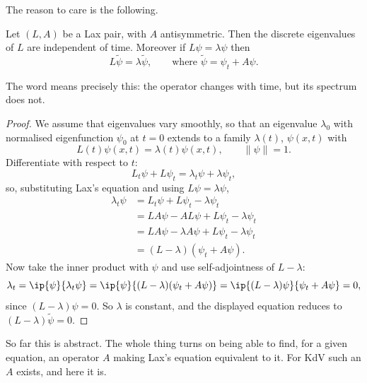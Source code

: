 The reason to care is the following.

\begin{theorem}
	Let $(L,A)$ be a Lax pair, with $A$ antisymmetric. Then the discrete eigenvalues of $L$ are independent of time. Moreover if $L\psi = \lambda\psi$ then
	$$
	L\tilde\psi = \lambda\tilde\psi, \qquad \text{where }\tilde\psi = \psi_t + A\psi.
	$$
\end{theorem}

The word  means precisely this: the operator changes with time, but its spectrum does not.

\begin{proof}
	We assume that eigenvalues vary smoothly, so that an eigenvalue $\lambda_0$ with normalised eigenfunction $\psi_0$ at $t=0$ extends to a family $\lambda(t)$, $\psi(x,t)$ with
	$$
	L(t)\psi(x,t) = \lambda(t)\psi(x,t), \qquad \|\psi\| = 1.
	$$
	Differentiate with respect to $t$:
	$$
	L_t\psi + L\psi_t = \lambda_t\psi + \lambda\psi_t,
	$$
	so, substituting Lax's equation and using $L\psi = \lambda\psi$,
	\begin{align*}
		\lambda_t\psi &= L_t\psi + L\psi_t - \lambda\psi_t\\
		&= LA\psi - AL\psi + L\psi_t - \lambda\psi_t\\
		&= LA\psi - \lambda A\psi + L\psi_t - \lambda\psi_t\\
		&= (L-\lambda)\left(\psi_t + A\psi\right).
	\end{align*}
	Now take the inner product with $\psi$ and use self-adjointness of $L - \lambda$:
	$$
	\lambda_t = \ip{\psi}{\lambda_t\psi} = \ip{\psi}{(L-\lambda)(\psi_t + A\psi)} = \ip{(L-\lambda)\psi}{\psi_t + A\psi} = 0,
	$$
	since $(L-\lambda)\psi = 0$. So $\lambda$ is constant, and the displayed equation reduces to $(L-\lambda)\tilde\psi = 0$.
\end{proof}

So far this is abstract. The whole thing turns on being able to find, for a given equation, an operator $A$ making Lax's equation equivalent to it. For KdV such an $A$ exists, and here it is.

